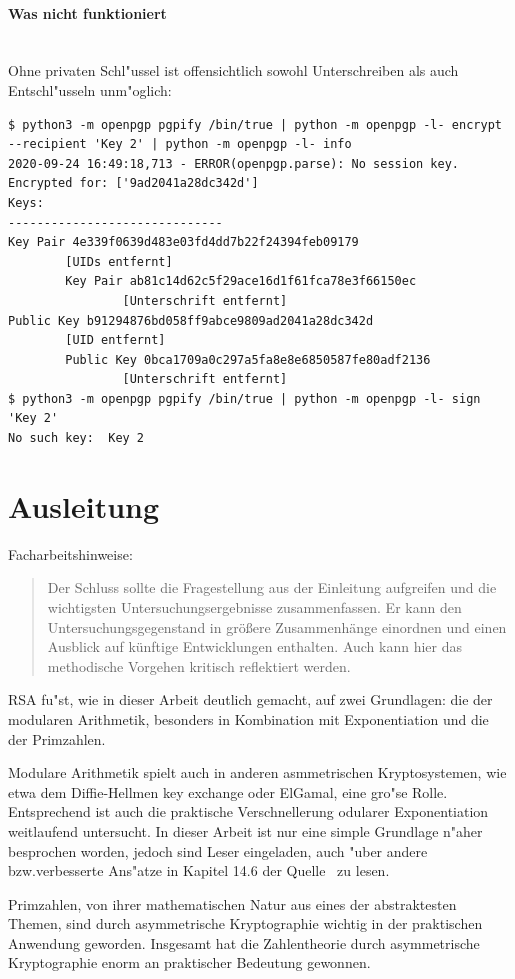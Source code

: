 \documentclass[12pt]{article}
\begin{document}
\paragraph{Was nicht funktioniert}~\\
Ohne privaten Schl"ussel ist offensichtlich sowohl Unterschreiben als auch Entschl"usseln unm"oglich:
\begin{lstlisting}
$ python3 -m openpgp pgpify /bin/true | python -m openpgp -l- encrypt --recipient 'Key 2' | python -m openpgp -l- info
2020-09-24 16:49:18,713 - ERROR(openpgp.parse): No session key. Encrypted for: ['9ad2041a28dc342d']
Keys:
------------------------------
Key Pair 4e339f0639d483e03fd4dd7b22f24394feb09179
        [UIDs entfernt]
        Key Pair ab81c14d62c5f29ace16d1f61fca78e3f66150ec
                [Unterschrift entfernt]
Public Key b91294876bd058ff9abce9809ad2041a28dc342d
        [UID entfernt]
        Public Key 0bca1709a0c297a5fa8e8e6850587fe80adf2136
                [Unterschrift entfernt]
$ python3 -m openpgp pgpify /bin/true | python -m openpgp -l- sign 'Key 2'
No such key:  Key 2
\end{lstlisting}

\section{Ausleitung}
Facharbeitshinweise:
\begin{quote}
Der Schluss sollte die Fragestellung aus der Einleitung aufgreifen und die wichtigsten Untersuchungsergebnisse zusammenfassen. Er kann den Untersuchungsgegenstand in größere Zusammenhänge einordnen und einen Ausblick auf künftige Entwicklungen enthalten. Auch kann hier das methodische Vorgehen kritisch reflektiert werden.
\end{quote}

RSA fu"st, wie in dieser Arbeit deutlich gemacht, auf zwei Grundlagen:
die der modularen Arithmetik, besonders in Kombination mit Exponentiation
und die der Primzahlen.

Modulare Arithmetik spielt auch in anderen asmmetrischen Kryptosystemen,
wie etwa dem Diffie-Hellmen key exchange oder ElGamal, eine gro"se Rolle.
Entsprechend ist auch die praktische Verschnellerung odularer Exponentiation
weitlaufend untersucht.
In dieser Arbeit ist nur eine simple Grundlage n"aher besprochen worden,
jedoch sind Leser eingeladen, auch "uber andere bzw.\@ verbesserte Ans"atze
in Kapitel 14.6 der Quelle~\cite{hac} zu lesen.

Primzahlen, von ihrer mathematischen Natur aus eines der abstraktesten Themen,
sind durch asymmetrische Kryptographie wichtig in der praktischen Anwendung geworden.
Insgesamt hat die Zahlentheorie durch asymmetrische Kryptographie enorm an praktischer Bedeutung gewonnen.
\end{document}
